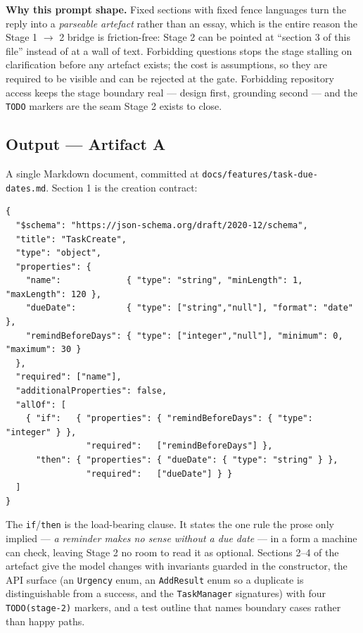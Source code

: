 \documentclass[11pt,a4paper]{article}
\newcommand{\code}[1]{\texttt{\small #1}}
\begin{document}
\textbf{Why this prompt shape.} Fixed sections with fixed fence languages turn
the reply into a \emph{parseable artefact} rather than an essay, which is the
entire reason the Stage 1 $\rightarrow$ 2 bridge is friction-free: Stage 2 can
be pointed at ``section 3 of this file'' instead of at a wall of text.
Forbidding questions stops the stage stalling on clarification before any
artefact exists; the cost is assumptions, so they are required to be visible
and can be rejected at the gate. Forbidding repository access keeps the stage
boundary real --- design first, grounding second --- and the \code{TODO}
markers are the seam Stage 2 exists to close.

\subsection{Output --- Artifact A}

A single Markdown document, committed at
\code{docs/features/task-due-dates.md}. Section 1 is the creation contract:

\begin{lstlisting}[style=plain]
{
  "$schema": "https://json-schema.org/draft/2020-12/schema",
  "title": "TaskCreate",
  "type": "object",
  "properties": {
    "name":             { "type": "string", "minLength": 1, "maxLength": 120 },
    "dueDate":          { "type": ["string","null"], "format": "date" },
    "remindBeforeDays": { "type": ["integer","null"], "minimum": 0, "maximum": 30 }
  },
  "required": ["name"],
  "additionalProperties": false,
  "allOf": [
    { "if":   { "properties": { "remindBeforeDays": { "type": "integer" } },
                "required":   ["remindBeforeDays"] },
      "then": { "properties": { "dueDate": { "type": "string" } },
                "required":   ["dueDate"] } }
  ]
}
\end{lstlisting}

\noindent The \code{if}/\code{then} is the load-bearing clause. It states the
one rule the prose only implied --- \emph{a reminder makes no sense without a
due date} --- in a form a machine can check, leaving Stage 2 no room to read it
as optional. Sections 2--4 of the artefact give the model changes with
invariants guarded in the constructor, the API surface (an \code{Urgency} enum,
an \code{AddResult} enum so a duplicate is distinguishable from a success, and
the \code{TaskManager} signatures) with four \code{TODO(stage-2)} markers, and a
test outline that names boundary cases rather than happy paths.
\end{document}
